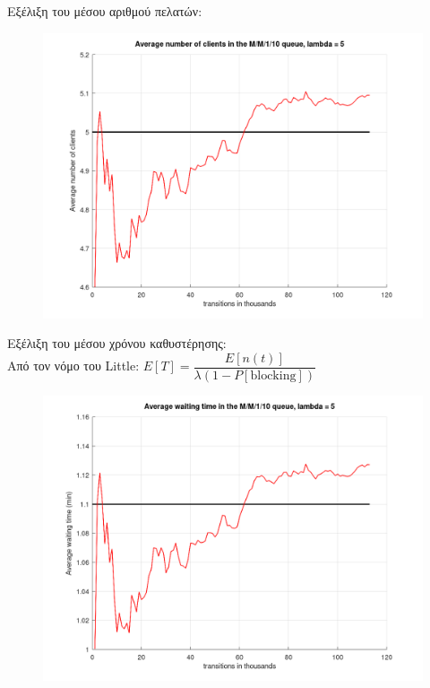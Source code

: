 \documentclass[a4paper]{article}
\begin{document}
\begin{minipage}{\textwidth}
Εξέλιξη του μέσου αριθμού πελατών:

\begin{figure}[H]
	\includegraphics[width=\textwidth]{images/clients2.png}
\end{figure}

Εξέλιξη του μέσου χρόνου καθυστέρησης: \\

Από τον νόμο του Little: $ E[T] = \dfrac{E[n(t)]}{λ(1-P[\text{blocking}])} $

\begin{figure}[H]
	\includegraphics[width=\textwidth]{images/time2.png}
\end{figure}
\end{minipage}
\end{document}

